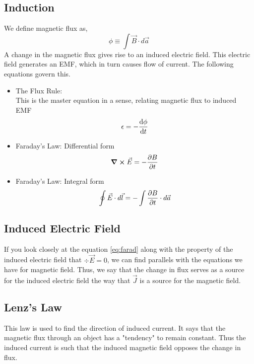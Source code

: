 \documentclass[12pt, oneside]{book}
\begin{document}
\subsection{Induction}
We define magnetic flux as,
\begin{equation}
	\phi \equiv \int \vec B \cdot d \vec a
\end{equation}
A change in the magnetic flux gives rise to an induced electric field. This electric field generates an EMF, which in turn causes flow of current. The following equations govern this.
\begin{tcolorbox}[colback=yellow!5!white,colframe=yellow!50!black]
	\begin{itemize}
	    \item The Flux Rule: \\
	     This is the master equation in a sense, relating magnetic flux to induced EMF
	    \begin{gather}
		\epsilon = - \dv{\phi}{t} 
	\end{gather}
	    \item Faraday's Law: Differential form
	    \begin{align}
		\curl \vec E = - \pdv{B}{t}
		\label{eq:farad}
	    \end{align}
	    
	    \item Faraday's Law: Integral form
	    \begin{align}
	        \oint \vec E \cdot d \vec l = - \int \pdv{B}{t} \cdot d \vec a 
	    \end{align}
	\end{itemize}
\end{tcolorbox}

\subsection{Induced Electric Field}
If you look closely at the equation \eqref{eq:farad} along with the property of the induced electric field that $\div \vec E = 0$, we can find parallels with the equations we have for magnetic field. Thus, we say that the change in flux serves as a source for the induced electric field the way that $\vec J$ is a source for the magnetic field.

\subsection{Lenz's Law}
This law is used to find the direction of induced current. It says that the magnetic flux through an object has a "tendency" to remain constant. Thus the induced current is such that the induced magnetic field opposes the change in flux.
\end{document}
